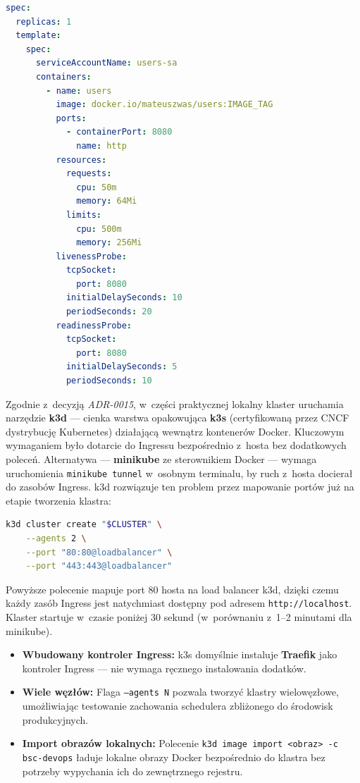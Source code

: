 \begin{lstlisting}[language=yaml, caption={Fragment manifestu Deployment z~sondami kondycji i~limitami zasobów (infrastructure/local/apps/users-deployment.yaml)}, label={lst:k8s-deployment}]
spec:
  replicas: 1
  template:
    spec:
      serviceAccountName: users-sa
      containers:
        - name: users
          image: docker.io/mateuszwas/users:IMAGE_TAG
          ports:
            - containerPort: 8080
              name: http
          resources:
            requests:
              cpu: 50m
              memory: 64Mi
            limits:
              cpu: 500m
              memory: 256Mi
          livenessProbe:
            tcpSocket:
              port: 8080
            initialDelaySeconds: 10
            periodSeconds: 20
          readinessProbe:
            tcpSocket:
              port: 8080
            initialDelaySeconds: 5
            periodSeconds: 10
\end{lstlisting}

Zgodnie z~decyzją \textit{ADR-0015}, w~części praktycznej lokalny klaster uruchamia narzędzie \textbf{k3d} --- cienka warstwa opakowująca \textbf{k3s} (certyfikowaną przez CNCF dystrybucję Kubernetes) działającą wewnątrz kontenerów Docker. Kluczowym wymaganiem było dotarcie do Ingressu bezpośrednio z~hosta bez dodatkowych poleceń. Alternatywa --- \textbf{minikube} ze sterownikiem Docker --- wymaga uruchomienia \texttt{minikube tunnel} w~osobnym terminalu, by ruch z~hosta docierał do zasobów Ingress. k3d rozwiązuje ten problem przez mapowanie portów już na etapie tworzenia klastra:

\begin{lstlisting}[language=bash, caption={Tworzenie klastra k3d z~mapowaniem portów Ingress (scripts/local/gitops-bootstrap.sh)}, label={lst:k3d-create}]
k3d cluster create "$CLUSTER" \
    --agents 2 \
    --port "80:80@loadbalancer" \
    --port "443:443@loadbalancer"
\end{lstlisting}

Powyższe polecenie mapuje port 80 hosta na load balancer k3d, dzięki czemu każdy zasób Ingress jest natychmiast dostępny pod adresem \texttt{http://localhost}. Klaster startuje w~czasie poniżej 30 sekund (w~porównaniu z~1--2 minutami dla minikube).

\begin{itemize}
    \item \textbf{Wbudowany kontroler Ingress:} k3s domyślnie instaluje \textbf{Traefik} jako kontroler Ingress --- nie wymaga ręcznego instalowania dodatków.
    \item \textbf{Wiele węzłów:} Flaga \texttt{--agents N} pozwala tworzyć klastry wielowęzłowe, umożliwiając testowanie zachowania schedulera zbliżonego do środowisk produkcyjnych.
    \item \textbf{Import obrazów lokalnych:} Polecenie \texttt{k3d image import <obraz> -c bsc-devops} ładuje lokalne obrazy Docker bezpośrednio do klastra bez potrzeby wypychania ich do zewnętrznego rejestru.
\end{itemize}

